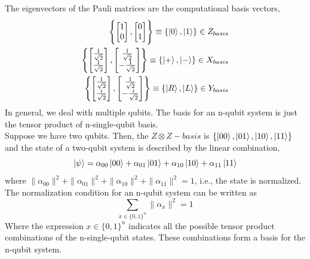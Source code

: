 The eigenvectors of the Pauli matrices are the computational basis vectors,
\begin{align*}
    \Biggl\{\begin{bmatrix}
           1 \\
           0 
         \end{bmatrix}, \begin{bmatrix}
           0 \\
           1 
         \end{bmatrix} \Biggr\}\equiv \{\ket{0}, \ket{1}\} \in Z_{basis} \\
         \Biggl\{\begin{bmatrix}
           \frac{1}{\sqrt{2}} \\
           \frac{1}{\sqrt{2}} 
         \end{bmatrix}, \begin{bmatrix}
           \frac{1}{\sqrt{2}} \\
           -\frac{1}{\sqrt{2}} 
         \end{bmatrix} \Biggr\}\equiv \{\ket{+}, \ket{-}\} \in X_{basis} \\
         \Biggl\{\begin{bmatrix}
           \frac{1}{\sqrt{2}} \\
           \frac{i}{\sqrt{2}} 
         \end{bmatrix}, \begin{bmatrix}
           \frac{1}{\sqrt{2}} \\
           -\frac{i}{\sqrt{2}} 
         \end{bmatrix} \Biggr\}\equiv \{\ket{R}, \ket{L}\} \in Y_{basis}
\end{align*}
In general, we deal with multiple qubits. The basis for an n-qubit system is just the tensor product of n-single-qubit basis.\\
Suppose we have two qubits. Then, the $Z\otimes Z-basis$ is $\{\ket{00},\ket{01},\ket{10},\ket{11}\}$ and the state of a two-qubit system is described by the linear combination,
\begin{equation}
    \ket{\psi} = \alpha_{00}\ket{00} +\alpha_{01}\ket{01} +\alpha_{10}\ket{10} +\alpha_{11}\ket{11}
\end{equation}
where $\|\alpha_{00}\|^{2} + \|\alpha_{01}\|^{2} + \|\alpha_{10}\|^{2} + \|\alpha_{11}\|^{2} = 1$, i.e., the state is normalized.\\
The normalization condition for an n-qubit system can be written as
\begin{equation}
\sum_{x\in \{0,1\}^{n}}\|\alpha_{x}\|^{2} = 1
\end{equation}
Where the expression $x \in \{0,1\}^{n}$ indicates all the possible tensor product combinations of the n-single-qubit states. These combinations form a basis for the n-qubit system.
